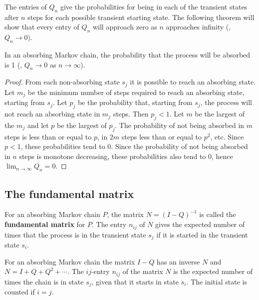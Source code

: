 The entries of $Q_n$ give the probabilities for being in each of the transient states after $n$ steps for each possible transient starting state. The following theorem will show that every entry of $Q_n$ will approach zero as $n$ approaches infinity (\ie, $Q_n \to 0$).

\begin{theorem}
In an absorbing Markov chain, the probability that the process will be absorbed is 1 (\ie, $Q_n \to 0$ as $n \to \infty$).
\end{theorem}

\begin{proof}
From each non-absorbing state $s_j$ it is possible to reach an absorbing state. Let $m_j$ be the minimum number of steps required to reach an absorbing state, starting from $s_j$. Let $p_j$ be the probability that, starting from $s_j$, the process will not reach an absorbing state in $m_j$ steps. Then $p_j < 1$. Let $m$ be the largest of the $m_j$ and let $p$ be the largest of $p_j$. The probability of not being absorbed in $m$ steps is less than or equal to $p$, in $2m$ steps less than or equal to $p^2$, etc. Since $p < 1$, these probabilities tend to 0. Since the probability of not being absorbed in $n$ steps is monotone decreasing, these probabilities also tend to 0, hence $\lim_{n\to\infty} Q_n = 0$.
\end{proof}

\subsection{The fundamental matrix}
\begin{definition}
For an absorbing Markov chain $P$, the matrix $N = (I-Q)^{-1}$ is called the \textbf{fundamental matrix} for $P$. The entry $n_{ij}$ of $N$ gives the expected number of times that the process is in the transient state $s_j$ if it is started in the transient state $s_i$.
\end{definition}

\begin{theorem}
For an absorbing Markov chain the matrix $I-Q$ has an inverse $N$ and $N = I + Q + Q^2 + \cdots$. The $ij$-entry $n_{ij}$ of the matrix $N$ is the expected number of times the chain is in state $s_j$, given that it starts in state $s_i$. The initial state is counted if $i = j$.
\end{theorem}

